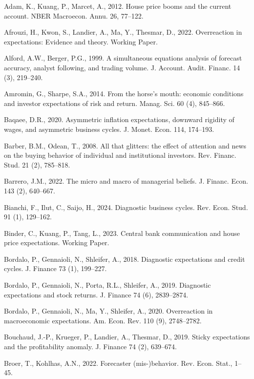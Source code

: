 \documentclass[12pt,a4paper]{article}
\newenvironment{original}
  {\par\medskip\noindent\ignorespaces}
  {\par\medskip}
\begin{document}
\begin{original}
\noindent Adam, K., Kuang, P., Marcet, A., 2012. House price booms and the current account. NBER Macroecon. Annu. 26, 77--122.

\noindent Afrouzi, H., Kwon, S., Landier, A., Ma, Y., Thesmar, D., 2022. Overreaction in expectations: Evidence and theory. Working Paper.

\noindent Alford, A.W., Berger, P.G., 1999. A simultaneous equations analysis of forecast accuracy, analyst following, and trading volume. J. Account. Audit. Financ. 14 (3), 219--240.

\noindent Amromin, G., Sharpe, S.A., 2014. From the horse's mouth: economic conditions and investor expectations of risk and return. Manag. Sci. 60 (4), 845--866.

\noindent Baqaee, D.R., 2020. Asymmetric inflation expectations, downward rigidity of wages, and asymmetric business cycles. J. Monet. Econ. 114, 174--193.

\noindent Barber, B.M., Odean, T., 2008. All that glitters: the effect of attention and news on the buying behavior of individual and institutional investors. Rev. Financ. Stud. 21 (2), 785--818.

\noindent Barrero, J.M., 2022. The micro and macro of managerial beliefs. J. Financ. Econ. 143 (2), 640--667.

\noindent Bianchi, F., Ilut, C., Saijo, H., 2024. Diagnostic business cycles. Rev. Econ. Stud. 91 (1), 129--162.

\noindent Binder, C., Kuang, P., Tang, L., 2023. Central bank communication and house price expectations. Working Paper.

\noindent Bordalo, P., Gennaioli, N., Shleifer, A., 2018. Diagnostic expectations and credit cycles. J. Finance 73 (1), 199--227.

\noindent Bordalo, P., Gennaioli, N., Porta, R.L., Shleifer, A., 2019. Diagnostic expectations and stock returns. J. Finance 74 (6), 2839--2874.

\noindent Bordalo, P., Gennaioli, N., Ma, Y., Shleifer, A., 2020. Overreaction in macroeconomic expectations. Am. Econ. Rev. 110 (9), 2748--2782.

\noindent Bouchaud, J.-P., Krueger, P., Landier, A., Thesmar, D., 2019. Sticky expectations and the profitability anomaly. J. Finance 74 (2), 639--674.

\noindent Broer, T., Kohlhas, A.N., 2022. Forecaster (mis-)behavior. Rev. Econ. Stat., 1--45.


\end{original}
\end{document}
